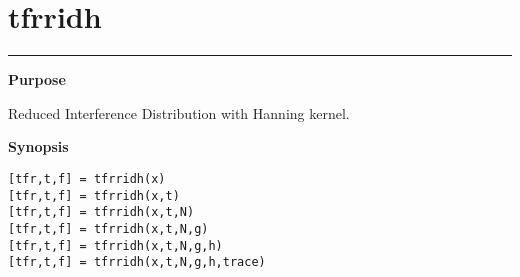 

\section*{\hspace*{-1.6cm} tfrridh}

\vspace*{-.4cm}
\hspace*{-1.6cm}\rule[0in]{16.5cm}{.02cm}
\vspace*{.2cm}

{\bf \large \sf Purpose}\\
\hspace*{1.5cm}
\begin{minipage}[t]{13.5cm}
Reduced Interference Distribution with Hanning kernel.
\end{minipage}
\vspace*{.5cm}

{\bf \large \sf Synopsis}\\
\hspace*{1.5cm}
\begin{minipage}[t]{13.5cm}
\begin{verbatim}
[tfr,t,f] = tfrridh(x)
[tfr,t,f] = tfrridh(x,t)
[tfr,t,f] = tfrridh(x,t,N)
[tfr,t,f] = tfrridh(x,t,N,g)
[tfr,t,f] = tfrridh(x,t,N,g,h)
[tfr,t,f] = tfrridh(x,t,N,g,h,trace)
\end{verbatim}
\end{minipage}
\vspace*{.5cm}

